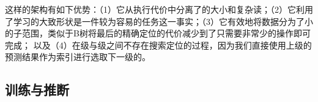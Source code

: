 
这样的架构有如下优势：（1）它从执行代价中分离了{\model}的大小和复杂读；（2）它利用了学习{\cdf}的大致形状是一件较为容易的任务这一事实；（3）它有效地将数据分为了小的子范围，类似于B树将最后的精确定位的代价减少到了只需要非常少的操作即可完成；
以及（4）在级与级之间不存在搜索定位的过程，因为我们直接使用上级{\model}的预测结果作为索引进行选取下一级的{\model}。


\subsection{{\rmi}训练与推断}


